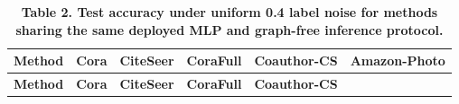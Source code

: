 \begin{longtable}[]{@{}
  >{\raggedright\arraybackslash}p{}
  >{\centering\arraybackslash}p{}
  >{\centering\arraybackslash}p{}
  >{\centering\arraybackslash}p{}
  >{\centering\arraybackslash}p{}
  >{\centering\arraybackslash}p{}@{}}
\caption{\textbf{Table 2. Test accuracy under uniform 0.4 label noise for methods sharing the same deployed MLP and graph-free inference protocol.}}\tabularnewline
\toprule\noalign{}
\begin{minipage}[b]{\linewidth}\raggedright
\textbf{Method}
\end{minipage} & \begin{minipage}[b]{\linewidth}\centering
\textbf{Cora}
\end{minipage} & \begin{minipage}[b]{\linewidth}\centering
\textbf{CiteSeer}
\end{minipage} & \begin{minipage}[b]{\linewidth}\centering
\textbf{CoraFull}
\end{minipage} & \begin{minipage}[b]{\linewidth}\centering
\textbf{Coauthor-CS}
\end{minipage} & \begin{minipage}[b]{\linewidth}\centering
\textbf{Amazon-Photo}
\end{minipage} \\
\midrule\noalign{}
\endfirsthead
\toprule\noalign{}
\begin{minipage}[b]{\linewidth}\raggedright
\textbf{Method}
\end{minipage} & \begin{minipage}[b]{\linewidth}\centering
\textbf{Cora}
\end{minipage} & \begin{minipage}[b]{\linewidth}\centering
\textbf{CiteSeer}
\end{minipage} & \begin{minipage}[b]{\linewidth}\centering
\textbf{CoraFull}
\end{minipage} & \begin{minipage}[b]{\linewidth}\centering
\textbf{Coauthor-CS}
\end{minipage} & \begin{minipage}[b]{\linewidth}\centering

\end{minipage}
\end{longtable}
